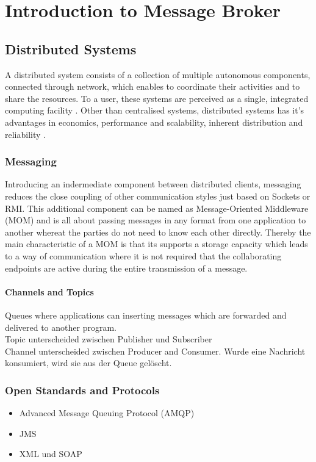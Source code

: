 \chapter{Introduction to Message Broker} \section{Distributed Systems} A
distributed system consists of a collection of multiple autonomous components,
connected through network, which enables to coordinate their activities and to
share the resources. To a user, these systems are perceived as a single,
integrated computing facility \cite{TAN06}. Other than centralised systems,
distributed systems has it's advantages in economics, performance and
scalability, inherent distribution and reliability \cite{POSA1}.

\subsection{Messaging} Introducing an indermediate component between distributed
clients, messaging reduces the close coupling of other communication styles just
based on Sockets or RMI. This additional component can be named as
Message-Oriented Middleware (MOM) and is all about passing messages in any
format from one application to another whereat the parties do not need to know
each other directly. Thereby the main characteristic of a MOM is that its
supports a storage capacity which leads to a way of communication where it is
not required that the collaborating endpoints are active during the entire
transmission of a message.\cite{TAN06}
 
\subsubsection{Channels and Topics} Queues where applications can inserting
messages which are forwarded and delivered to another program. 
\\ 
Topic unterscheided zwischen Publisher und Subscriber
\\ Channel unterscheided zwischen Producer and Consumer. Wurde eine Nachricht
konsumiert, wird sie aus der Queue gelöscht. 

\subsection{Open Standards and Protocols} 
\begin{itemize} 
	\item Advanced Message Queuing Protocol (AMQP) 
	\item JMS	
	\item XML und SOAP
\end{itemize}

